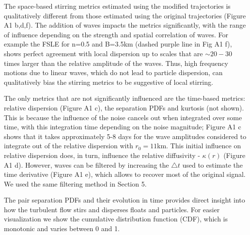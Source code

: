\documentclass[]{ametsoc}
\begin{document}
The space-based stirring metrics estimated using the modified trajectories is qualitatively different from those estimated using the original trajectories (Figure A1 b,d,f). The addition of waves impacts the metrics significantly, with the range of influence depending on the strength and spatial correlation of waves. For example the FSLE for n=0.5 and B=3.5km (dashed purple line in Fig A1 f), shows perfect agreement with local dispersion up to scales that are $\sim20-30$ times larger than the relative amplitude of the waves. Thus, high frequency motions due to linear waves, which do not lead to particle dispersion, can qualitatively bias the stirring metrics to be suggestive of local stirring.

The only metrics that are not significantly influenced are the time-based metrics: relative dispersion (Figure A1 c), the separation PDFs and kurtosis (not shown). This is because the influence of the noise cancels out when integrated over some time, with this integration time depending on the noise magnitude; Figure A1 c shows that it takes approximately 5-8 days for the wave amplitudes considered to integrate out of the relative dispersion with $r_0=11$km. This initial influence on relative dispersion does, in turn, influence the relative diffusivity - $\kappa(r)$ (Figure A1 d). However, waves can be filtered by increasing the $\triangle t$ used to estimate the time derivative (Figure A1 e), which allows to recover most of the original signal. We used the same filtering method in Section 5.  


\appendix[B]
The pair separation PDFs and their evolution in time provides direct insight into how the turbulent flow stirs and disperses floats and particles. For easier visualization we show the cumulative distribution function (CDF), which is monotonic and varies between 0 and 1. 
\end{document}
